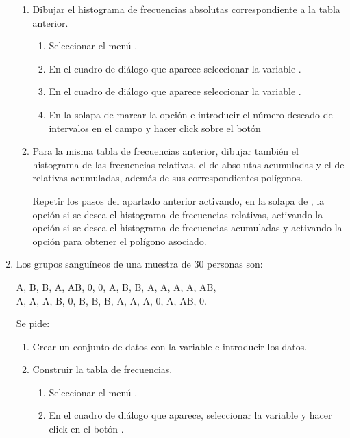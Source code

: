 \begin{enumerate}[leftmargin=*]
\begin{enumerate}
\item  Dibujar el histograma de frecuencias absolutas correspondiente a la tabla anterior.
\begin{indicacion}{
\begin{enumerate}
\item Seleccionar el menú .
\item En el cuadro de diálogo que aparece seleccionar la variable .
\item En el cuadro de diálogo que aparece seleccionar la variable .
\item En la solapa de   marcar la opción  e introducir el número deseado de intervalos en el campo  y hacer click sobre el botón
\end{enumerate}}
\end{indicacion}

\item Para la misma tabla de frecuencias anterior, dibujar también el histograma de las frecuencias relativas, el de
absolutas acumuladas y el de relativas acumuladas, además de sus correspondientes polígonos.
\begin{indicacion}{Repetir los pasos del apartado anterior activando, en la solapa de ,
la opción  si se desea el histograma de frecuencias relativas, activando la opción
 si se desea el histograma de frecuencias acumuladas y activando la opción
 para obtener el polígono asociado.}
\end{indicacion}
\end{enumerate}

\item Los grupos sanguíneos de una muestra de 30 personas son:
\begin{center}
A, B, B, A, AB, 0, 0, A, B, B, A, A, A, A, AB,\\
A, A, A, B, 0, B, B, B, A, A, A, 0, A, AB, 0. 
\end{center}
Se pide:
\begin{enumerate}
\item Crear un conjunto de datos con la variable  e introducir los datos.

\item Construir la tabla de frecuencias.
\begin{indicacion}{
\begin{enumerate}
\item Seleccionar el menú  .
\item En el cuadro de diálogo que aparece, seleccionar la variable  y hacer click en el botón
.
\end{enumerate}}
\end{indicacion}


\end{enumerate}
\end{enumerate}

